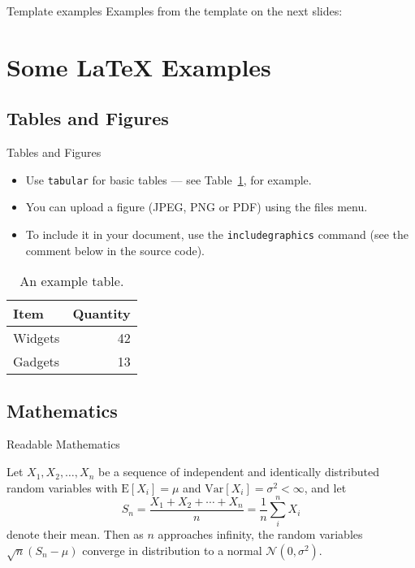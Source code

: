 \documentclass{beamer}
\begin{document}
\begin{frame}{Template examples}
  Examples from the template on the next slides:
\end{frame}

\section{Some \LaTeX{} Examples}

\subsection{Tables and Figures}

\begin{frame}{Tables and Figures}

\begin{itemize}
\item Use \texttt{tabular} for basic tables --- see Table~\ref{tab:widgets}, for example.
\item You can upload a figure (JPEG, PNG or PDF) using the files menu.
\item To include it in your document, use the \texttt{includegraphics} command (see the comment below in the source code).
\end{itemize}


\begin{table}
\centering
\begin{tabular}{l|r}
Item & Quantity \\\hline
Widgets & 42 \\
Gadgets & 13
\end{tabular}
\caption{\label{tab:widgets}An example table.}
\end{table}

\end{frame}

\subsection{Mathematics}

\begin{frame}{Readable Mathematics}

Let $X_1, X_2, \ldots, X_n$ be a sequence of independent and identically distributed random variables with $\text{E}[X_i] = \mu$ and $\text{Var}[X_i] = \sigma^2 < \infty$, and let
$$S_n = \frac{X_1 + X_2 + \cdots + X_n}{n}
      = \frac{1}{n}\sum_{i}^{n} X_i$$
denote their mean. Then as $n$ approaches infinity, the random variables $\sqrt{n}(S_n - \mu)$ converge in distribution to a normal $\mathcal{N}(0, \sigma^2)$.

\end{frame}
\end{document}
